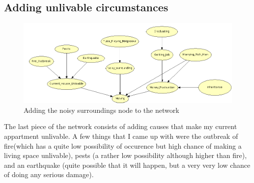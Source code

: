 \documentclass[12pt]{article} %
\begin{document}
\subsection{Adding unlivable circumstances} %


\begin{figure}[h!]
    \centering
    \includegraphics[width=1\textwidth]{network3}
    \caption{Adding the noisy surroundings node to the network}
    \label{ref:noisy}
\end{figure}

The last piece of the network consists of adding causes that make my current
appartment unlivable. A few things that I came up with were the outbreak of
fire(which has a quite low possibility of occurence but high chance of making a
living space unlivable), pests (a rather low
possibility although higher than fire), and an earthquake (quite possible that
it will happen, but a very very low chance of doing any serious damage).
\end{document}
